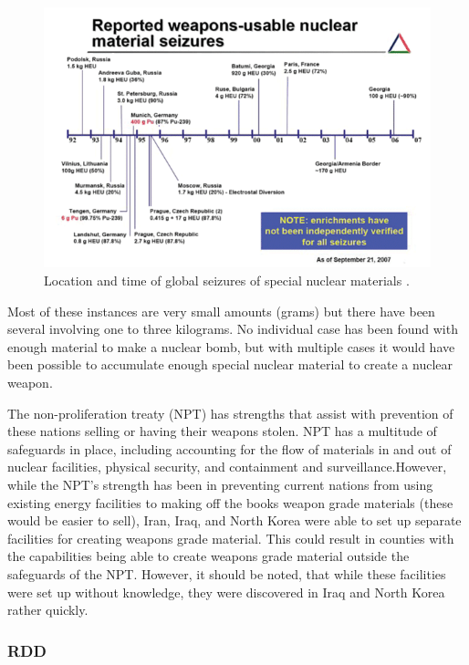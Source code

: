 \documentclass{report}
\begin{document}
\begin{figure}[h]
 \centering
 \includegraphics[trim = 0cm 0cm 0cm 0cm, clip,scale=0.7]{./figures/seizures.png}
   \caption{Location and time of global seizures of special nuclear materials \cite{Muller2007}.}
     \label{fig:seizures}
\end{figure}


Most of these instances are very small amounts (grams) but there have been several involving one to three kilograms. No individual case has been found with enough material to make a nuclear bomb, but with multiple cases it would have been possible to accumulate enough special nuclear material to create a nuclear weapon. 

The non-proliferation treaty (NPT) has strengths that assist with prevention of these nations selling or having their weapons stolen. NPT has a multitude of safeguards in place, including accounting for the flow of materials in and out of nuclear facilities, physical security, and containment and surveillance.However, while the NPT’s strength has been in preventing current nations from using existing energy facilities to making off the books weapon grade materials (these would be easier to sell), Iran, Iraq, and North Korea were able to set up separate facilities for creating weapons grade material. This could result in counties with the capabilities being able to create weapons grade material outside the safeguards of the NPT. However, it should be noted, that while these facilities were set up without knowledge, they were discovered in Iraq and North Korea rather quickly.


\subsubsection{RDD}
 
\end{document}
